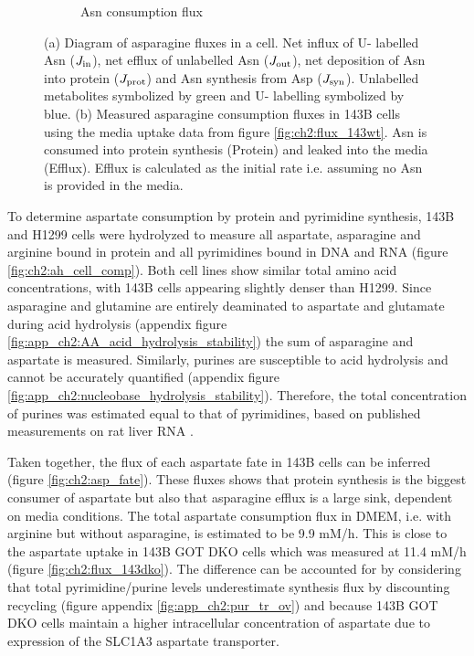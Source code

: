 \begin{figure}[ht]
\begin{subfigure}[b]{0.4\textwidth}
         \caption{Asn consumption flux}
         \label{fig:ch2:Asn_flux}
     \end{subfigure}
     \hspace{0.1\textwidth}
        \caption[Asparagine consumption fluxes.]{
        (a) Diagram of asparagine fluxes in a cell.
        Net influx of U-\hCi{} labelled Asn ($J_{\text{in}}$), net efflux of unlabelled Asn ($J_{\text{out}}$), net deposition of Asn into protein ($J_{\text{prot}}$) and Asn synthesis from Asp ($J_{\text{syn}}$).
        Unlabelled metabolites symbolized by green and U-\hCi{} labelling symbolized by blue.
        (b) Measured asparagine consumption fluxes in 143B cells using the media uptake data from figure \ref{fig:ch2:flux_143wt}.
        Asn is consumed into protein synthesis (Protein) and leaked into the media (Efflux).
        Efflux is calculated as the initial rate i.e. assuming no Asn is provided in the media.
        }
\end{figure}




To determine aspartate consumption by protein and pyrimidine synthesis, 143B and H1299 cells were hydrolyzed to measure all aspartate, asparagine and arginine bound in protein and all pyrimidines bound in DNA and RNA (figure \ref{fig:ch2:ah_cell_comp}).
Both cell lines show similar total amino acid concentrations, with 143B cells appearing slightly denser than H1299.
Since asparagine and glutamine are entirely deaminated to aspartate and glutamate during acid hydrolysis (appendix figure \ref{fig:app_ch2:AA_acid_hydrolysis_stability}) the sum of asparagine and aspartate is measured.
Similarly, purines are susceptible to acid hydrolysis and cannot be accurately quantified (appendix figure \ref{fig:app_ch2:nucleobase_hydrolysis_stability}).
Therefore, the total concentration of purines was estimated equal to that of pyrimidines, based on published measurements on rat liver RNA \cite{Lipshitz1960-jw}.

Taken together, the flux of each aspartate fate in 143B cells can be inferred (figure \ref{fig:ch2:asp_fate}).
These fluxes shows that protein synthesis is the biggest consumer of aspartate but also that asparagine efflux is a large sink, dependent on media conditions.
The total aspartate consumption flux in DMEM, i.e. with arginine but without asparagine, is estimated to be 9.9 mM/h.
This is close to the aspartate uptake in 143B GOT DKO cells which was measured at 11.4 mM/h (figure \ref{fig:ch2:flux_143dko}).
The difference can be accounted for by considering that total pyrimidine/purine levels underestimate synthesis flux by discounting recycling (figure appendix \ref{fig:app_ch2:pur_tr_ov}) and because 143B GOT DKO cells maintain a higher intracellular concentration of aspartate due to expression of the SLC1A3 aspartate transporter.

